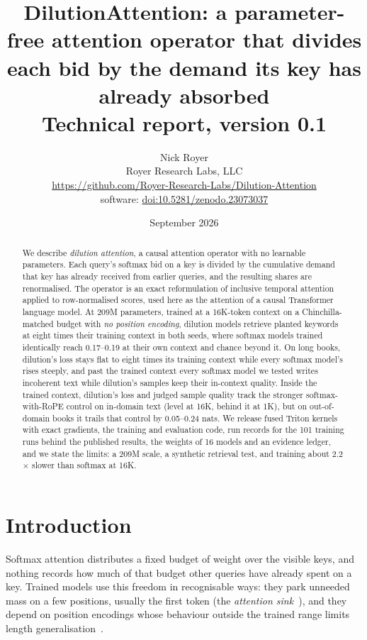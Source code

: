 \documentclass[11pt]{article}
\title{DilutionAttention: a parameter-free attention operator that divides each bid by the demand its key has already absorbed\\[4pt]\large Technical report, version 0.1}
\author{Nick Royer\\Royer Research Labs, LLC\\\small\url{https://github.com/Royer-Research-Labs/Dilution-Attention}\\\small software: \href{https://doi.org/10.5281/zenodo.23073037}{doi:10.5281/zenodo.23073037}}
\date{September 2026}
\begin{document}
\maketitle

\begin{abstract}
We describe \emph{dilution attention}, a causal attention operator with no learnable parameters.
Each query's softmax bid on a key is divided by the cumulative demand that key has already received
from earlier queries, and the resulting shares are renormalised. The operator is an exact
reformulation of inclusive temporal attention applied to row-normalised scores, used here as the
attention of a causal Transformer language model. At 209M parameters, trained at a 16K-token context
on a Chinchilla-matched budget with \emph{no position encoding}, dilution models retrieve planted
keywords at eight times their training context in both seeds, where softmax models trained
identically reach 0.17--0.19 at their own context and chance beyond it. On long books, dilution's
loss stays flat to eight times its training context while every softmax model's rises steeply, and
past the trained context every softmax model we tested writes incoherent text while dilution's
samples keep their in-context quality. Inside the trained context, dilution's loss and judged sample
quality track the stronger softmax-with-RoPE control on in-domain text (level at 16K, behind it at
1K), but on out-of-domain books it trails that control by 0.05--0.24 nats. We release fused Triton kernels with exact
gradients, the training and evaluation code, run records for the 101 training runs behind the
published results, the weights of 16 models and an evidence ledger, and we state the limits: a 209M scale, a synthetic
retrieval test, and training about 2.2$\times$ slower than softmax at 16K.
\end{abstract}

\section{Introduction}

Softmax attention distributes a fixed budget of weight over the visible keys, and nothing records how
much of that budget other queries have already spent on a key. Trained models use this freedom in
recognisable ways: they park unneeded mass on a few positions, usually the first token (the
\emph{attention sink}~\cite{streamingllm,stablemask}), and they depend on position encodings whose
behaviour outside the trained range limits length generalisation~\cite{rope,nope,pi,yarn}.
\end{document}
